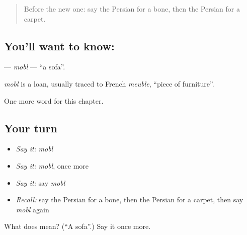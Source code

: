 \label{lesson:FA-C109-mobl}



\begin{quote}
Before the new one: say the Persian for a bone, then the Persian for a carpet.
\end{quote}

\subsection*{You'll want to know: }
\textbf{} — \emph{mobl} — \textquotedblleft{}a sofa\textquotedblright{}.

\begin{cousinweb}
\emph{mobl} is a loan, usually traced to French \emph{meuble}, \textquotedblleft{}piece of furniture\textquotedblright{}.
\end{cousinweb}

\begin{grammarlens}[title={What you've built}]
One more word for this chapter.
\end{grammarlens}

\subsection*{Your turn}
\begin{itemize}
\raggedright
  \item \emph{Say it:} \emph{mobl}
  \item \emph{Say it:} \emph{mobl}, once more
  \item \emph{Say it:} say \emph{mobl}
  \item \emph{Recall:} say the Persian for a bone, then the Persian for a carpet, then say \emph{mobl} again
\end{itemize}

\begin{tcolorbox}[breakable,colback=teal!4,colframe=teal!35!black,title={Before you move on}]
What does  mean? (\textquotedblleft{}A sofa\textquotedblright{}.) Say it once more.
\end{tcolorbox}
